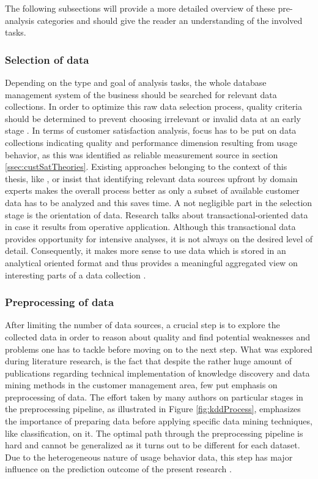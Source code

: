 The following subsections will provide a more detailed overview of these pre-analysis categories and should give the reader an understanding of the involved tasks. 

\subsubsection{Selection of data}
\label{sssec:selectionData}
Depending on the type and goal of analysis tasks, the whole database management system of the business should be searched for relevant data collections. In order to optimize this raw data selection process, quality criteria should be determined to prevent choosing irrelevant or invalid data at an early stage \cite{mozer2000predicting} \cite{fayyad1996data}. In terms of customer satisfaction analysis, focus has to be put on data collections indicating quality and performance dimension resulting from usage behavior, as this was identified as reliable measurement source in section \ref{ssec:custSatTheories}. Existing approaches belonging to the context of this thesis, like \cite{mozer2000predicting}, \cite{meinzer2016can} or \cite{zhao2005customer} insist that identifying relevant data sources upfront by domain experts makes the overall process better as only a subset of available customer data has to be analyzed and this saves time. A not negligible part in the selection stage is the orientation of data. Research talks about transactional-oriented data in case it results from operative application. Although this transactional data provides opportunity for intensive analyses, it is not always on the desired level of detail. Consequently, it makes more sense to use data which is stored in an analytical oriented format and thus provides a meaningful aggregated view on interesting parts of a data collection \cite{neckel2015}. 

\subsubsection{Preprocessing of data}
\label{sssec:explorationData}
After limiting the number of data sources, a crucial step is to explore the collected data in order to reason about quality and find potential weaknesses and problems one has to tackle before moving on to the next step. What was explored during literature research, is the fact that despite the rather huge amount of publications regarding technical implementation of knowledge discovery and data mining methods in the customer management area, few put emphasis on preprocessing of data. The effort taken by many authors on particular stages in the preprocessing pipeline, as illustrated in Figure \ref{fig:kddProcess}, emphasizes the importance of preparing data before applying specific data mining techniques, like classification, on it. The optimal path through the preprocessing pipeline is hard and cannot be generalized as it turns out to be different for each dataset. Due to the heterogeneous nature of usage behavior data, this step has major influence on the prediction outcome of the present research \cite{fayyad1996data}. 

